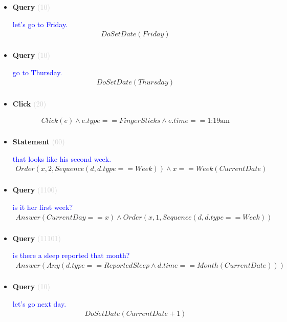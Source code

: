 \documentclass[11pt]{article}
\newcommand{\key}[1]{\textcolor{lightgray}{#1}}
\newcounter{CQuery}
\newcounter{CStatement}
\newcounter{CClick}
\begin{document}
\begin{itemize}
\item
\textbf{Query\theCQuery} \key{(10)} \addtocounter{CQuery}{1}
\textcolor{blue}{ let's go to Friday. }
\begin{multline*}
DoSetDate(Friday) \\ 
\end{multline*}


\item
\textbf{Query\theCQuery} \key{(10)} \addtocounter{CQuery}{1}
\textcolor{blue}{ go to Thursday. }
\begin{multline*}
DoSetDate(Thursday) \\ 
\end{multline*}


\item
\textbf{Click\theCClick} \key{(20)} \addtocounter{CClick}{1}
\textcolor{blue}{  }
\begin{multline*}
Click(e) \wedge e.type==FingerSticks \wedge e.time==\mbox{1:19am} \\ 
\end{multline*}


\item
\textbf{Statement\theCStatement} \key{(00)} \addtocounter{CStatement}{1}
\textcolor{blue}{ that looks like his second week. }
\begin{multline*}
Order(x, 2, Sequence(d, d.type==Week)) \wedge x==Week(CurrentDate) \\ 
\end{multline*}


\item
\textbf{Query\theCQuery} \key{(1100)} \addtocounter{CQuery}{1}
\textcolor{blue}{ is it her first week? }
\begin{multline*}
Answer(CurrentDay==x) \wedge Order(x, 1, Sequence(d, d.type==Week)) \\ 
\end{multline*}


\item
\textbf{Query\theCQuery} \key{(11101)} \addtocounter{CQuery}{1}
\textcolor{blue}{ is there a sleep reported that month? }
\begin{multline*}
Answer(Any(d.type==ReportedSleep \wedge d.time==Month(CurrentDate))) \\ 
\end{multline*}


\item
\textbf{Query\theCQuery} \key{(10)} \addtocounter{CQuery}{1}
\textcolor{blue}{ let's go next day. }
\begin{multline*}
DoSetDate(CurrentDate + 1) \\ 
\end{multline*}



\end{itemize}
\end{document}
